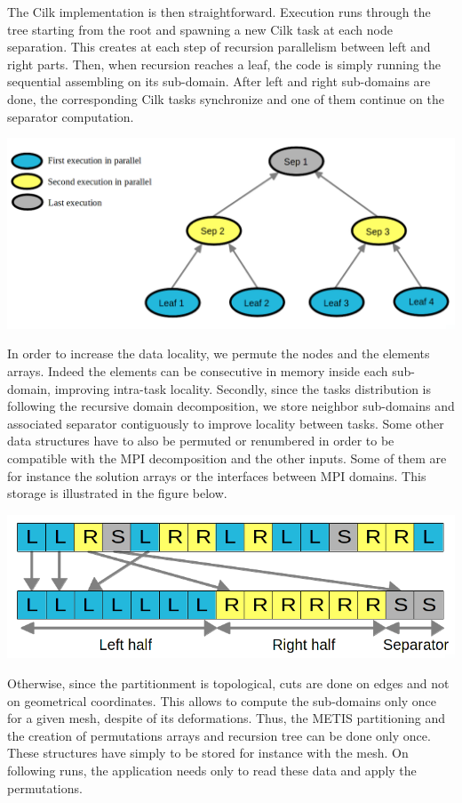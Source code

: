 \documentclass{IOS-Book-Article}
\begin{document}
The Cilk implementation is then straightforward. Execution runs through the tree starting from the root and spawning a new Cilk task at each node separation.
This creates at each step of recursion parallelism between left and right parts.
Then, when recursion reaches a leaf, the code is simply running the sequential assembling on its sub-domain.
After left and right sub-domains are done, the corresponding Cilk tasks synchronize and one of them continue on the separator computation.
\begin{center}
 \includegraphics[scale=0.25]{Recursion_tree.png}
\end{center}
In order to increase the data locality, we permute the nodes and the elements arrays. Indeed the elements can be consecutive in memory inside each sub-domain,
improving intra-task locality.
Secondly, since the tasks distribution is following the recursive domain decomposition, we store neighbor sub-domains and associated separator contiguously to improve
locality between tasks. Some other data structures have to also be permuted or renumbered in order to be compatible with the MPI decomposition and the other inputs.
Some of them are for instance the solution arrays or the interfaces between MPI domains.
This storage is illustrated in the figure below.
\begin{center}
 \includegraphics[scale=0.25]{Data_permutations.png}
\end{center}
Otherwise, since the partitionment is topological, cuts are done on edges and not on geometrical coordinates. This allows to compute the sub-domains only once
for a given mesh, despite of its deformations. Thus, the METIS partitioning and the creation of permutations arrays and recursion tree can be done only once.
These structures have simply to be stored for instance with the mesh. On following runs, the application needs only to read these data and apply the permutations.
\end{document}
